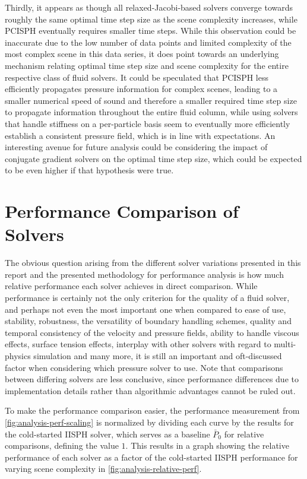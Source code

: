 \documentclass[oneside, a4paper]{book}
\begin{document}
  Thirdly, it appears as though all relaxed-Jacobi-based solvers converge towards roughly the same optimal time step size as the scene complexity increases, while PCISPH eventually requires smaller time steps. While this observation could be inaccurate due to the low number of data points and limited complexity of the most complex scene in this data series, it does point towards an underlying mechanism relating optimal time step size and scene complexity for the entire respective class of fluid solvers. It could be speculated that PCISPH less efficiently propagates pressure information for complex scenes, leading to a smaller numerical speed of sound and therefore a smaller required time step size to propagate information throughout the entire fluid column, while using solvers that handle stiffness on a per-particle basis seem to eventually more efficiently establish a consistent pressure field, which is in line with expectations. An interesting avenue for future analysis could be considering the impact of conjugate gradient solvers on the optimal time step size, which could be expected to be even higher if that hypothesis were true.

  

  \section{Performance Comparison of Solvers}
  The obvious question arising from the different solver variations presented in this report and the presented methodology for performance analysis is how much relative performance each solver achieves in direct comparison. While performance is certainly not the only criterion for the quality of a fluid solver, and perhaps not even the most important one when compared to ease of use, stability, robustness, the versatility of boundary handling schemes, quality and temporal consistency of the velocity and pressure fields, ability to handle viscous effects, surface tension effects, interplay with other solvers with regard to multi-physics simulation and many more, it is still an important and oft-discussed factor when considering which pressure solver to use. Note that comparisons between differing solvers are less conclusive, since performance differences due to implementation details rather than algorithmic advantages cannot be ruled out.

  To make the performance comparison easier, the performance measurement from \autoref{fig:analysis-perf-scaling} is normalized by dividing each curve by the results for the cold-started IISPH solver, which serves as a baseline  $\bar{P}_0$ for relative comparisons, defining the value $1$. This results in a graph showing the relative performance of each solver as a factor of the cold-started IISPH performance for varying scene complexity in \autoref{fig:analysis-relative-perf}. 
\end{document}

